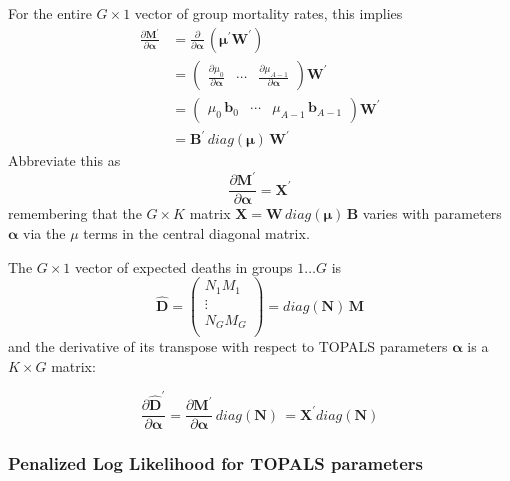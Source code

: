 \documentclass{article}
\begin{document}
\noindent For the entire $G \times 1$ vector of group mortality rates, this implies
$$
\begin{aligned}
\frac{\partial \boldsymbol{M}^\prime}{\partial \boldsymbol{\alpha}} &= 
\frac{\partial }{\partial \boldsymbol{\alpha}}\,(\boldsymbol{\mu}^\prime \boldsymbol{W}^\prime) \\& = 
\begin{pmatrix}
\frac{\partial \mu_0}{\partial \boldsymbol{\alpha}}
& \cdots  
& \frac{\partial \mu_{A-1}}{\partial \boldsymbol{\alpha}}
\end{pmatrix} \boldsymbol{W}^\prime \\
&=
\begin{pmatrix} 
\mu_0 \, \boldsymbol{b}_0 
& \cdots  
& \mu_{A-1} \, \boldsymbol{b}_{A-1}
\end{pmatrix} \boldsymbol{W}^\prime \\
&= \boldsymbol{B}^\prime \, diag(\boldsymbol{\mu}) \,\boldsymbol{W}^\prime
\end{aligned}
$$
\noindent Abbreviate this as 
$$
\frac{\partial \boldsymbol{M}^\prime}{\partial \boldsymbol{\alpha}} = \boldsymbol{X}^\prime
$$
\noindent remembering that the $G \times K$ matrix $\boldsymbol{X}=\boldsymbol{W} \, diag(\boldsymbol{\mu}) \,\boldsymbol{B}$ varies with parameters $\boldsymbol{\alpha}$ via the $\mu$ terms in the central diagonal matrix.


The $G \times 1$ vector of expected deaths in groups $1\ldots G$ is
$$
\hat{\boldsymbol{D}} = \begin{pmatrix}
N_1 M_1 \\
\vdots \\
N_G M_G \\
\end{pmatrix} = diag(\boldsymbol{N})\, \boldsymbol{M}
$$
and the 
derivative of its transpose with respect to TOPALS parameters $\boldsymbol{\alpha}$ is a $K \times G$ matrix:

\begin{equation}
\label{eq:dg-dalpha}
\frac{\partial \hat{\boldsymbol{D}}^\prime}  
{\partial \boldsymbol{\alpha}} =   
\frac{\partial \boldsymbol{M}^\prime}{\partial \boldsymbol{\alpha}}\, diag(\boldsymbol{N})\,
=
 \boldsymbol{X}^\prime diag(\boldsymbol{N})
\end{equation}


\subsubsection{Penalized Log Likelihood for TOPALS parameters}
\end{document}
